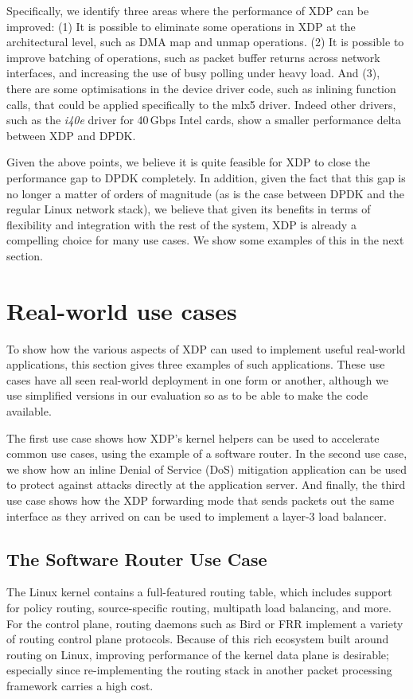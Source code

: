 \documentclass[10pt,sigconf,anonymous]{acmart}
\begin{document}
Specifically, we identify three areas where the performance of XDP can be
improved: (1) It is possible to eliminate some operations in XDP at the
architectural level, such as DMA map and unmap operations. (2) It is possible to
improve batching of operations, such as packet buffer returns across network
interfaces, and increasing the use of busy polling under heavy load. And (3),
there are some optimisations in the device driver code, such as inlining
function calls, that could be applied specifically to the mlx5 driver. Indeed
other drivers, such as the \emph{i40e} driver for 40\,Gbps Intel cards, show a
smaller performance delta between XDP and DPDK.

Given the above points, we believe it is quite feasible for XDP to close the
performance gap to DPDK completely. In addition, given the fact that this gap is
no longer a matter of orders of magnitude (as is the case between DPDK and the
regular Linux network stack), we believe that given its benefits in terms of
flexibility and integration with the rest of the system, XDP is already a
compelling choice for many use cases. We show some examples of this in the next
section.

\section{Real-world use cases}
\label{sec:usecases}
To show how the various aspects of XDP can used to implement useful real-world
applications, this section gives three examples of such applications. These use
cases have all seen real-world deployment in one form or another, although we
use simplified versions in our evaluation so as to be able to make the code
available.

The first use case shows how XDP's kernel helpers can be used to accelerate
common use cases, using the example of a software router. In the second use
case, we show how an inline Denial of Service (DoS) mitigation application can
be used to protect against attacks directly at the application server. And
finally, the third use case shows how the XDP forwarding mode that sends packets
out the same interface as they arrived on can be used to implement a layer-3
load balancer.

\subsection{The Software Router Use Case}
\label{sec:fwd-usecase}
The Linux kernel contains a full-featured routing table, which includes support
for policy routing, source-specific routing, multipath load balancing, and more.
For the control plane, routing daemons such as Bird or FRR implement a variety
of routing control plane protocols. Because of this rich ecosystem built around
routing on Linux, improving performance of the kernel data plane is desirable;
especially since re-implementing the routing stack in another packet processing
framework carries a high cost.
\end{document}
